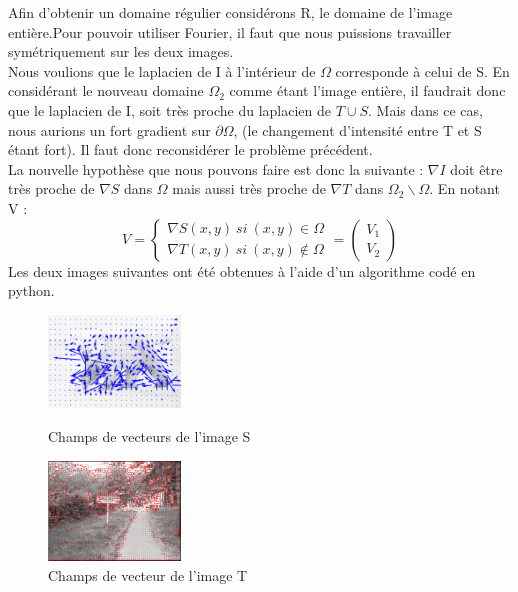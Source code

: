 Afin d'obtenir un domaine régulier considérons R, le domaine de l'image entière.Pour pouvoir utiliser Fourier, il faut que nous puissions travailler symétriquement sur les deux images.\\
Nous voulions que le laplacien de I à l'intérieur de $\Omega$ corresponde à celui de S. En considérant le nouveau domaine $\Omega_2$ comme étant l'image entière, il faudrait donc que le laplacien de I, soit très proche du laplacien de $T \cup S$. Mais dans ce cas, nous aurions un fort gradient sur $\partial \Omega$, (le  changement d'intensité entre T et S étant fort).  Il faut donc reconsidérer le problème précédent. \\
La nouvelle hypothèse que nous pouvons faire  est donc la suivante : $\nabla I$ doit être très proche de $\nabla S$ dans $\Omega$ mais aussi très proche de $\nabla T$ dans $\Omega_2 \backslash \Omega$. En notant V : 
\begin{equation}
V = 
\left\{
\begin{aligned}
\nabla S(x,y) \ si \ (x,y) \in \Omega\\
\nabla T(x,y) \ si \ (x,y) \notin \Omega
\end{aligned}
\right.
= \begin{pmatrix}
V_1\\
V_2
\end{pmatrix}
\end{equation}
Les deux images suivantes ont été obtenues à l'aide d'un algorithme codé en python.
\begin{figure}[!htb]
   \begin{minipage}{0.5\textwidth}
     \centering
     \includegraphics[width = 100pt]{Images/vector_fieldOurs.png}
\caption{Champs de vecteurs de l'image S}
      \end{minipage}\hfill
         \begin{minipage}{0.5\textwidth}
     \centering
     \includegraphics[width = 100pt]{Images/vector_fieldOursT.png}
\caption{Champs de vecteur de l'image T}
      \end{minipage}\hfill
      \end{figure}
      
